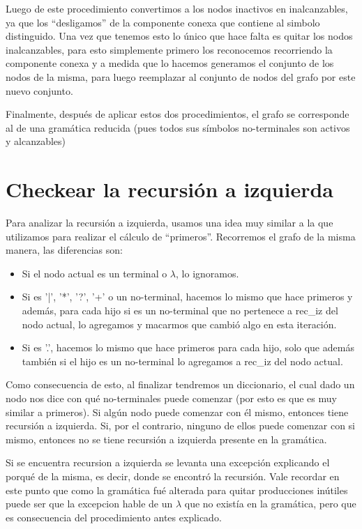 \documentclass[a4paper]{report}
\begin{document}
	Luego de este procedimiento convertimos a los nodos inactivos en inalcanzables, 
ya que los ``desligamos'' de la componente conexa que contiene al simbolo distinguido. Una vez 
que tenemos esto lo único que hace falta es quitar los nodos inalcanzables, para esto simplemente 
primero los reconocemos recorriendo la componente conexa y a medida que lo hacemos generamos 
el conjunto de los nodos de la misma, para luego reemplazar al conjunto de nodos del grafo 
por este nuevo conjunto.


	Finalmente, después de aplicar estos dos procedimientos, el grafo se
corresponde al de una gramática reducida (pues todos sus símbolos no-terminales son
activos y alcanzables)


\section*{Checkear la recursión a izquierda}

	Para analizar la recursión a izquierda, usamos una idea muy similar a la que
utilizamos para realizar el cálculo de ``primeros''. Recorremos el grafo de la misma manera, las
diferencias son:


\begin{itemize}

\item Si el nodo actual es un terminal o $\lambda$, lo ignoramos.

\item Si es '|', '*', '?', '+' o un no-terminal, hacemos lo mismo que hace primeros y además, para cada hijo si es un no-terminal que no pertenece a rec\_iz del nodo actual, lo agregamos y macarmos que cambió algo en
esta iteración.

\item Si es '.', hacemos lo mismo que hace primeros para cada hijo, solo que además también si el hijo es un no-terminal lo agregamos a rec\_iz del
nodo actual.

\end{itemize}


	Como consecuencia de esto, al finalizar tendremos un diccionario, el cual dado un nodo nos
dice con qué no-terminales puede comenzar (por esto es que es muy similar a
primeros). Si algún nodo puede comenzar con él mismo, entonces tiene recursión a
izquierda. Si, por el contrario, ninguno de ellos puede comenzar con si mismo, entonces no se tiene
recursión a izquierda presente en la gramática.

	Si se encuentra recursion a izquierda se levanta una excepción explicando el porqué de la misma, es decir, donde se encontró la recursión. Vale recordar en este punto que como la gramática fué alterada para quitar producciones inútiles puede ser que la excepcion hable de un $\lambda$ que no existía en la gramática, pero que es consecuencia del procedimiento antes explicado.
\end{document}
